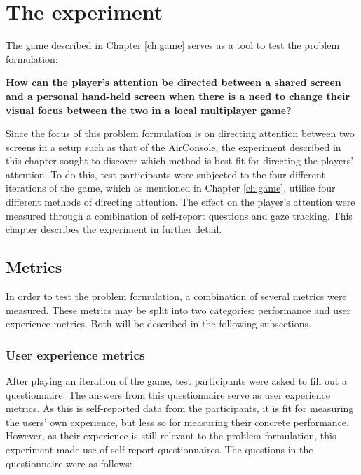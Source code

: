 \chapter{The experiment}\label{ch:experiment}
The game described in Chapter \ref{ch:game} serves as a tool to test the problem formulation:

\begin{changemargin}{1cm}{1cm}
\textbf{How can the player’s attention be directed between a shared screen and a personal hand-held screen when there is a need to change their visual focus between the two in a local multiplayer game?}
\end{changemargin}

Since the focus of this problem formulation is on directing attention between two screens in a setup such as that of the AirConsole, the experiment described in this chapter sought to discover which method is best fit for directing the players' attention. To do this, test participants were subjected to the four different iterations of the game, which as mentioned in Chapter \ref{ch:game}, utilise four different methods of directing attention. The effect on the player's attention were measured through a combination of self-report questions and gaze tracking. This chapter describes the experiment in further detail.

\section{Metrics}
In order to test the problem formulation, a combination of several metrics were measured. These metrics may be split into two categories: performance and user experience metrics. Both will be described in the following subsections.

\subsection{User experience metrics}\label{subsec:user_experience_metrics}
After playing an iteration of the game, test participants were asked to fill out a questionnaire. The answers from this questionnaire serve as user experience metrics. As this is self-reported data from the participants, it is fit for measuring the users' own experience, but less so for measuring their concrete performance. However, as their experience is still relevant to the problem formulation, this experiment made use of self-report questionnaires. The questions in the questionnaire were as follows:

